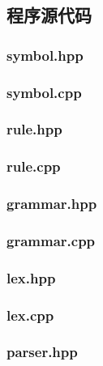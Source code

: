 \subsection{程序源代码}
\subsubsection{symbol.hpp}


\subsubsection{symbol.cpp}


\subsubsection{rule.hpp}


\subsubsection{rule.cpp}


\subsubsection{grammar.hpp}


\subsubsection{grammar.cpp}


\subsubsection{lex.hpp}


\subsubsection{lex.cpp}


\subsubsection{parser.hpp}


